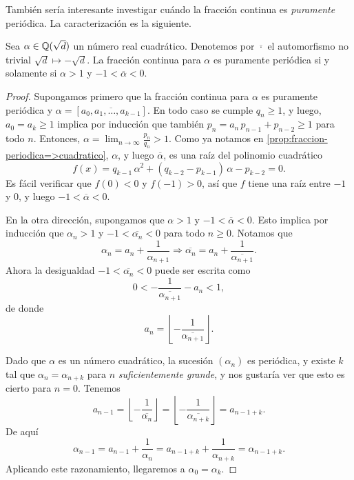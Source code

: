 También sería interesante investigar cuándo la fracción continua es
\emph{puramente} periódica. La caracterización es la siguiente.

\begin{teorema}
  Sea $\alpha \in \mathbb{Q} (\sqrt{d})$ un número real cuadrático. Denotemos por
  $\overline{\cdot}$ el automorfismo no trivial $\sqrt{d} \mapsto -\sqrt{d}$.
  La fracción continua para $\alpha$ es puramente periódica si y solamente si
  $\alpha > 1$ y $-1 < \overline{\alpha} < 0$.

  \begin{proof}
    Supongamos primero que la fracción continua para $\alpha$ es puramente
    periódica y $\alpha = [\overline{a_0,a_1,\ldots,a_{k-1}}]$. En todo caso se
    cumple $q_n \ge 1$, y luego, $a_0 = a_k \ge 1$ implica por inducción que
    también ${p_n = a_n\,p_{n-1} + p_{n-2} \ge 1}$ para todo $n$. Entonces,
    $\alpha = \lim_{n\to\infty} \frac{p_n}{q_n} > 1$. Como ya notamos en
    \ref{prop:fraccion-periodica=>cuadratico}, $\alpha$, y luego
    $\overline{\alpha}$, es una raíz del polinomio cuadrático
    $$f (x) = q_{k-1}\,\alpha^2 + (q_{k-2} - p_{k-1})\,\alpha - p_{k-2} = 0.$$
    Es fácil verificar que $f (0) < 0$ y $f (-1) > 0$, así que $f$ tiene una raíz
    entre $-1$ y $0$, y luego $-1 < \overline{\alpha} < 0$.

    \vspace{1em}

    En la otra dirección, supongamos que $\alpha > 1$ y
    $-1 < \overline{\alpha} < 0$. Esto implica por inducción que $\alpha_n > 1$
    y $-1 < \overline{\alpha_n} < 0$ para todo $n \ge 0$. Notamos que
    \[ \alpha_n = a_n + \frac{1}{\alpha_{n+1}} \Longrightarrow
       \overline{\alpha_n} = a_n + \frac{1}{\overline{\alpha_{n+1}}}. \]
    Ahora la desigualdad $-1 < \overline{\alpha_n} < 0$ puede ser escrita como
    $$0 < -\frac{1}{\overline{\alpha_{n+1}}} - a_n < 1,$$
    de donde
    $$a_n = \left\lfloor-\frac{1}{\overline{\alpha_{n+1}}}\right\rfloor.$$

    Dado que $\alpha$ es un número cuadrático, la sucesión $(\alpha_n)$ es
    periódica, y existe $k$ tal que $\alpha_n = \alpha_{n+k}$ para $n$
    \emph{suficientemente grande}, y nos gustaría ver que esto es cierto para
    $n = 0$. Tenemos
    \[ a_{n-1} = \left\lfloor-\frac{1}{\overline{\alpha_n}}\right\rfloor =
       \left\lfloor-\frac{1}{\overline{\alpha_{n+k}}}\right\rfloor = a_{n-1+k}. \]
    De aquí
    \[ \alpha_{n-1} = a_{n-1} + \frac{1}{\alpha_n} =
       a_{n-1+k} + \frac{1}{\alpha_{n+k}} = \alpha_{n-1+k}. \]
    Aplicando este razonamiento, llegaremos a $\alpha_0 = \alpha_k$.
  \end{proof}
\end{teorema}

